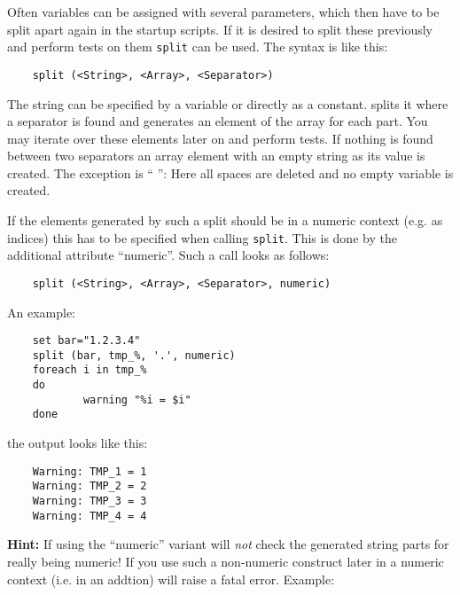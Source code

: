     Often variables can be assigned with several parameters, which then
    have to be split apart again in the startup scripts. If it is desired
    to split these previously and perform tests on them \texttt{split}
    can be used. The syntax is like this:

\begin{example}
\begin{verbatim}
    split (<String>, <Array>, <Separator>)
\end{verbatim}
\end{example}

    The string can be specified by a variable or directly as a
    constant.  splits it where a separator is found
    and generates an element of the array for each part. You may iterate
    over these elements later on and perform tests. If nothing is found between
    two separators an array element with an empty string as its value is created.
    The exception is `` '': Here all spaces are deleted and no empty variable is
    created.

    If the elements generated by such a split should be in a numeric context (e.g.
    as indices) this has to be specified when calling \texttt{split}. This is done by
    the additional attribute ``numeric''. Such a call looks as follows:

\begin{example}
\begin{verbatim}
    split (<String>, <Array>, <Separator>, numeric)
\end{verbatim}
\end{example}

   An example:

\begin{example}
\begin{verbatim}
    set bar="1.2.3.4"
    split (bar, tmp_%, '.', numeric)
    foreach i in tmp_%
    do
            warning "%i = $i"
    done
\end{verbatim}
\end{example}

    the output looks like this:

\begin{example}
\begin{verbatim}
    Warning: TMP_1 = 1
    Warning: TMP_2 = 2
    Warning: TMP_3 = 3
    Warning: TMP_4 = 4
\end{verbatim}
\end{example}

    \textbf{Hint:} If using the ``numeric'' variant  will \emph{not}
    check the generated string parts for really being numeric! If you use such a
    non-numeric construct later in a numeric context (i.e. in an addtion) 
    will raise a fatal error. Example:

